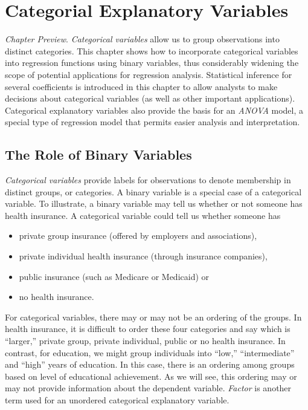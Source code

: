 \setcounter{chapter}{3}

\chapter{Categorial Explanatory Variables}


{\small \textit{Chapter Preview}. \textit{Categorical variables}
allow us to group observations into distinct categories. This
chapter shows how to incorporate categorical variables into
regression functions using binary variables, thus considerably
widening the scope of potential applications for regression
analysis. Statistical inference for several coefficients is
introduced in this chapter to allow analysts to make decisions about
categorical variables (as well as other important applications).
Categorical explanatory variables also provide the basis for an
\textit{ANOVA} model, a special type of
regression model that permits easier analysis and interpretation.}

\section{The Role of Binary Variables}\label{S4:BinaryVar}


\textit{Categorical variables} provide labels for observations to
denote membership in distinct groups, or categories. A binary
variable is a special case of a categorical variable. To illustrate,
a binary variable may tell us whether or not someone has health
insurance. A categorical variable could tell us whether someone has
\begin{itemize}
\item private group insurance (offered by employers and
associations), \item private individual health insurance (through
insurance companies), \item public insurance (such as Medicare or
Medicaid) or \item no health insurance.
\end{itemize}

\noindent For categorical variables, there may or may not be an
ordering of the groups. In health insurance, it is difficult to
order these four categories and say which is ``larger,'' private
group, private individual, public or no health insurance. In
contrast, for education, we might group individuals into ``low,''
``intermediate'' and ``high'' years of education. In this case,
there is an ordering among groups based on level of educational
achievement. As we will see, this ordering may or may not
provide information about the dependent variable. \textit{Factor} is
another term used for an unordered categorical explanatory variable.

